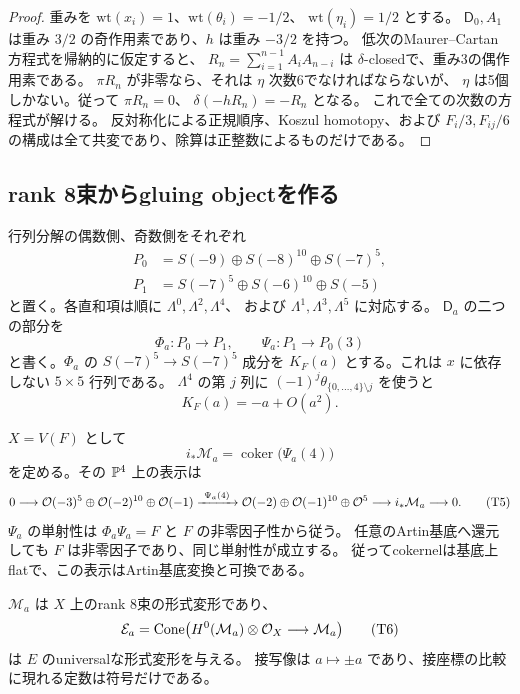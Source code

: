 \begin{proof}
重みを $\mathrm{wt}(x_i)=1$、$\mathrm{wt}(\theta_i)=-1/2$、
$\mathrm{wt}(\eta_i)=1/2$ とする。
$\mathsf D_0,A_1$ は重み $3/2$ の奇作用素であり、$h$ は重み $-3/2$ を持つ。
低次のMaurer--Cartan方程式を帰納的に仮定すると、
$R_n=\sum_{i=1}^{n-1}A_iA_{n-i}$ は $\delta$-closedで、重み3の偶作用素である。
$\pi R_n$ が非零なら、それは $\eta$ 次数6でなければならないが、
$\eta$ は5個しかない。従って $\pi R_n=0$、
$\delta(-hR_n)=-R_n$ となる。
これで全ての次数の方程式が解ける。
反対称化による正規順序、Koszul homotopy、および
$F_i/3,F_{ij}/6$ の構成は全て共変であり、除算は正整数によるものだけである。
\end{proof}

\subsection{rank 8束からgluing objectを作る}

行列分解の偶数側、奇数側をそれぞれ
\[
 \begin{aligned}
 P_0&=S(-9)\oplus S(-8)^{10}\oplus S(-7)^5,\\
 P_1&=S(-7)^5\oplus S(-6)^{10}\oplus S(-5)
 \end{aligned}
\]
と置く。各直和項は順に $\Lambda^0,\Lambda^2,\Lambda^4$、
および $\Lambda^1,\Lambda^3,\Lambda^5$ に対応する。
$\mathsf D_a$ の二つの部分を
\[
 \Phi_a:P_0\longrightarrow P_1,
 \qquad \Psi_a:P_1\longrightarrow P_0(3)
\]
と書く。$\Phi_a$ の $S(-7)^5\to S(-7)^5$ 成分を
$K_F(a)$ とする。これは $x$ に依存しない $5\times5$ 行列である。
$\Lambda^4$ の第 $j$ 列に $(-1)^j\theta_{\{0,\ldots,4\}\setminus j}$ を使うと
\[
                         K_F(a)=-a+O(a^2).
 \tag{T4}\label{eq:tate-K-linear}
\]

$X=V(F)$ として
\[
 i_*\mathcal M_a=\operatorname{coker}\bigl(\Psi_a(4)\bigr)
\]
を定める。その $\mathbb P^4$ 上の表示は
\[
 0\longrightarrow
 \mathcal O(-3)^5\oplus\mathcal O(-2)^{10}\oplus\mathcal O(-1)
 \xrightarrow{\ \Psi_a(4)\ }
 \mathcal O(-2)\oplus\mathcal O(-1)^{10}\oplus\mathcal O^5
 \longrightarrow i_*\mathcal M_a\longrightarrow0.
 \tag{T5}\label{eq:tate-bundle-resolution}
\]
$\Psi_a$ の単射性は $\Phi_a\Psi_a=F$ と $F$ の非零因子性から従う。
任意のArtin基底へ還元しても $F$ は非零因子であり、同じ単射性が成立する。
従ってcokernelは基底上flatで、この表示はArtin基底変換と可換である。

\begin{lemma}[実際のuniversal対象]\label{lem:tate-universal-object}
$\mathcal M_a$ は $X$ 上のrank 8束の形式変形であり、
\[
 \mathcal E_a=\operatorname{Cone}\bigl(
 H^0(\mathcal M_a)\otimes\mathcal O_X\longrightarrow\mathcal M_a\bigr)
 \tag{T6}\label{eq:tate-evaluation-object}
\]
は $E$ のuniversalな形式変形を与える。
接写像は $a\mapsto\pm a$ であり、接座標の比較に現れる定数は符号だけである。
\end{lemma}

